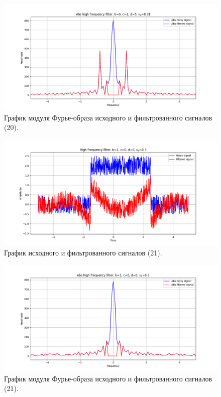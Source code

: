 \documentclass[a4paper, 12pt]{article}
\begin{document}
    \begin{figure}[!htb]
        \centering
        \includegraphics[scale=0.48]{20_abs_u_U_nolow.png}
        \captionsetup{skip=0pt}
        \caption{График модуля Фурье-образа исходного и фильтрованного сигналов (20).}
        \label{fig:fig66}
    \end{figure}
    \begin{figure}[!htb]
        \centering
        \includegraphics[scale=0.48]{21_u_flt_u_nolow.png}
        \captionsetup{skip=0pt}
        \caption{График исходного и фильтрованного сигналов (21).}
        \label{fig:fig67}
    \end{figure}
    \newpage
    \begin{figure}[!htb]
        \centering
        \includegraphics[scale=0.48]{21_abs_u_U_nolow.png}
        \captionsetup{skip=0pt}
        \caption{График модуля Фурье-образа исходного и фильтрованного сигналов (21).}
        \label{fig:fig68}
    \end{figure}
\end{document}

